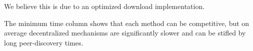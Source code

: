 \documentclass{article}
\begin{document}
We believe this is due to an optimized download implementation.

The minimum time column shows that each method can be competitive, but on average decentralized
  mechanisms are significantly slower and can be stifled by long peer-discovery times.
  







\end{document}
